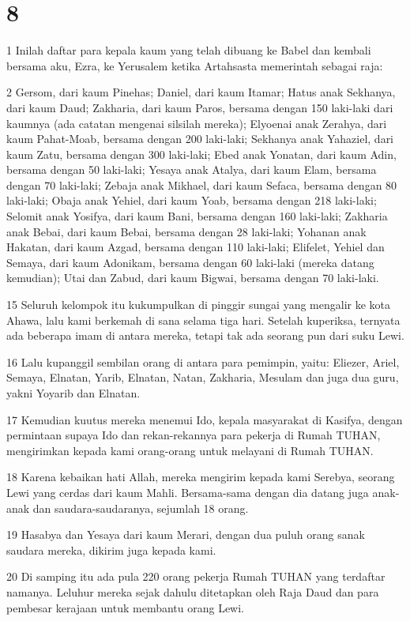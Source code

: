 \chapter{8}

\par 1 Inilah daftar para kepala kaum yang telah dibuang ke Babel dan kembali bersama aku, Ezra, ke Yerusalem ketika Artahsasta memerintah sebagai raja:
\par 2 Gersom, dari kaum Pinehas; Daniel, dari kaum Itamar; Hatus anak Sekhanya, dari kaum Daud; Zakharia, dari kaum Paros, bersama dengan 150 laki-laki dari kaumnya (ada catatan mengenai silsilah mereka); Elyoenai anak Zerahya, dari kaum Pahat-Moab, bersama dengan 200 laki-laki; Sekhanya anak Yahaziel, dari kaum Zatu, bersama dengan 300 laki-laki; Ebed anak Yonatan, dari kaum Adin, bersama dengan 50 laki-laki; Yesaya anak Atalya, dari kaum Elam, bersama dengan 70 laki-laki; Zebaja anak Mikhael, dari kaum Sefaca, bersama dengan 80 laki-laki; Obaja anak Yehiel, dari kaum Yoab, bersama dengan 218 laki-laki; Selomit anak Yosifya, dari kaum Bani, bersama dengan 160 laki-laki; Zakharia anak Bebai, dari kaum Bebai, bersama dengan 28 laki-laki; Yohanan anak Hakatan, dari kaum Azgad, bersama dengan 110 laki-laki; Elifelet, Yehiel dan Semaya, dari kaum Adonikam, bersama dengan 60 laki-laki (mereka datang kemudian); Utai dan Zabud, dari kaum Bigwai, bersama dengan 70 laki-laki.
\par 15 Seluruh kelompok itu kukumpulkan di pinggir sungai yang mengalir ke kota Ahawa, lalu kami berkemah di sana selama tiga hari. Setelah kuperiksa, ternyata ada beberapa imam di antara mereka, tetapi tak ada seorang pun dari suku Lewi.
\par 16 Lalu kupanggil sembilan orang di antara para pemimpin, yaitu: Eliezer, Ariel, Semaya, Elnatan, Yarib, Elnatan, Natan, Zakharia, Mesulam dan juga dua guru, yakni Yoyarib dan Elnatan.
\par 17 Kemudian kuutus mereka menemui Ido, kepala masyarakat di Kasifya, dengan permintaan supaya Ido dan rekan-rekannya para pekerja di Rumah TUHAN, mengirimkan kepada kami orang-orang untuk melayani di Rumah TUHAN.
\par 18 Karena kebaikan hati Allah, mereka mengirim kepada kami Serebya, seorang Lewi yang cerdas dari kaum Mahli. Bersama-sama dengan dia datang juga anak-anak dan saudara-saudaranya, sejumlah 18 orang.
\par 19 Hasabya dan Yesaya dari kaum Merari, dengan dua puluh orang sanak saudara mereka, dikirim juga kepada kami.
\par 20 Di samping itu ada pula 220 orang pekerja Rumah TUHAN yang terdaftar namanya. Leluhur mereka sejak dahulu ditetapkan oleh Raja Daud dan para pembesar kerajaan untuk membantu orang Lewi.
